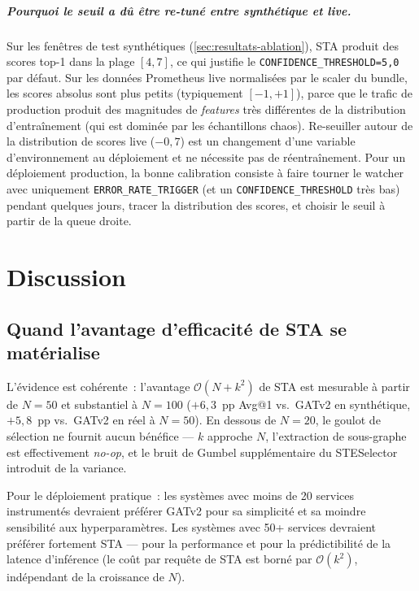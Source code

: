 \documentclass[a4paper,11pt,oneside]{report}
\begin{document}
\paragraph{Pourquoi le seuil a d\^u \^etre re-tun\'e entre synth\'etique et live.}
Sur les fen\^etres de test synth\'etiques (\cref{sec:resultats-ablation}), STA produit des scores top-1 dans la plage $[4, 7]$, ce qui justifie le \texttt{CONFIDENCE\_THRESHOLD=5{,}0} par d\'efaut. Sur les donn\'ees Prometheus live normalis\'ees par le scaler du bundle, les scores absolus sont plus petits (typiquement $[-1, +1]$), parce que le trafic de production produit des magnitudes de \emph{features} tr\`es diff\'erentes de la distribution d'entra\^inement (qui est domin\'ee par les \'echantillons chaos). Re-seuiller autour de la distribution de scores live ($-0{,}7$) est un changement d'une variable d'environnement au d\'eploiement et ne n\'ecessite pas de r\'eentra\^inement. Pour un d\'eploiement production, la bonne calibration consiste \`a faire tourner le watcher avec uniquement \texttt{ERROR\_RATE\_TRIGGER} (et un \texttt{CONFIDENCE\_THRESHOLD} tr\`es bas) pendant quelques jours, tracer la distribution des scores, et choisir le seuil \`a partir de la queue droite.

\chapter{Discussion}
\label{chap:discussion}

\section{Quand l'avantage d'efficacit\'e de STA se mat\'erialise}
\label{sec:disc-sta-quand}

L'\'evidence est coh\'erente~: l'avantage $\mathcal{O}(N + k^2)$ de STA est mesurable \`a partir de $N{=}50$ et substantiel \`a $N{=}100$ ($+6{,}3$~pp Avg@1 vs.\ GATv2 en synth\'etique, $+5{,}8$~pp vs.\ GATv2 en r\'eel \`a $N{=}50$). En dessous de $N{=}20$, le goulot de s\'election ne fournit aucun b\'en\'efice --- $k$ approche $N$, l'extraction de sous-graphe est effectivement \emph{no-op}, et le bruit de Gumbel suppl\'ementaire du STESelector introduit de la variance.

Pour le d\'eploiement pratique~: les syst\`emes avec moins de 20 services instrument\'es devraient pr\'ef\'erer GATv2 pour sa simplicit\'e et sa moindre sensibilit\'e aux hyperparam\`etres. Les syst\`emes avec 50+ services devraient pr\'ef\'erer fortement STA --- pour la performance et pour la pr\'edictibilit\'e de la latence d'inf\'erence (le co\^ut par requ\^ete de STA est born\'e par $\mathcal{O}(k^2)$, ind\'ependant de la croissance de $N$).
\end{document}
